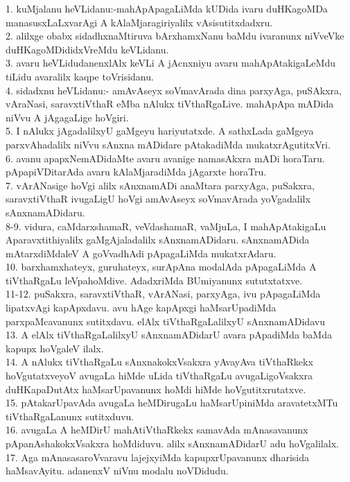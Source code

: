 \documentclass{article}
\begin{document}
1. kuMjalanu heVLidanu:-mahApApagaLiMda kUDida ivaru duHKagoMDa manasusxLaLxvarAgi A kAlaMjaragiriyalilx vAsisutitxdadxru.\\
2. alilxge obabx sidadhxnaMtiruva bArxhamxNanu baMdu ivaranunx niVveVke duHKagoMDididxVreMdu keVLidanu.\\
3. avaru heVLidudanenxlAlx keVLi A jAcnxniyu avaru mahApAtakigaLeMdu tiLidu avaralilx kaqpe toVrisidanu.\\
4. sidadxnu heVLidanu:- amAvAseyx soVmavArada dina parxyAga, puSAkxra, vAraNasi, saravxtiVthaR eMba nAlukx tiVthaRgaLive. mahApApa mADida niVvu A jAgagaLige hoVgiri.\\
5. I nAlukx jAgadalilxyU gaMgeyu hariyutatxde. A sathxLada gaMgeya parxvAhadalilx niVvu sAnxna mADidare pAtakadiMda mukatxrAgutitxVri.\\
6. avanu apapxNemADidaMte avaru avanige namasAkxra mADi horaTaru. pApapiVDitarAda avaru kAlaMjaradiMda jAgarxte horaTru.\\
7. vArANasige hoVgi alilx sAnxnamADi anaMtara parxyAga, puSakxra, saravxtiVthaR ivugaLigU hoVgi amAvAseyx soVmavArada yoVgadalilx sAnxnamADidaru.\\
8-9. vidura, caMdarxshamaR, veVdashamaR, vaMjuLa, I mahApAtakigaLu Aparavxtithiyalilx gaMgAjaladalilx sAnxnamADidaru. sAnxnamADida mAtarxdiMdaleV A goVvadhAdi pApagaLiMda mukatxrAdaru.\\
10. barxhamxhateyx, guruhateyx, surApAna modalAda pApagaLiMda A tiVthaRgaLu leVpahoMdive. AdadxriMda BUmiyanunx sututxtatxve.\\
11-12. puSakxra, saravxtiVthaR, vArANasi, parxyAga, ivu pApagaLiMda lipatxvAgi kapApxdavu. avu hAge kapApxgi haMsarUpadiMda parxpaMcavanunx sutitxdavu. elAlx tiVthaRgaLalilxyU sAnxnamADidavu \\
13. A elAlx tiVthaRgaLalilxyU sAnxnamADidarU avara pApadiMda baMda kapupx hoVgaleV ilalx.\\
14. A nAlukx tiVthaRgaLu sAnxnakokxVsakxra yAvayAva tiVthaRkekx hoVgutatxveyoV avugaLa hiMde uLida tiVthaRgaLu avugaLigoVsakxra duHKapaDutAtx haMsarUpavanunx hoMdi hiMde hoVgutitxrutatxve.\\
15. pAtakarUpavAda avugaLa heMDirugaLu haMsarUpiniMda aravatetxMTu tiVthaRgaLanunx sutitxduvu.\\
16. avugaLa A heMDirU mahAtiVthaRkekx samavAda mAnasavanunx pApanAshakokxVsakxra hoMdiduvu. alilx sAnxnamADidarU adu hoVgalilalx.\\
17. Aga mAnasasaroVvaravu lajejxyiMda kapupxrUpavanunx dharisida haMsavAyitu. adanenxV niVnu modalu noVDidudu.\\
\end{document}
